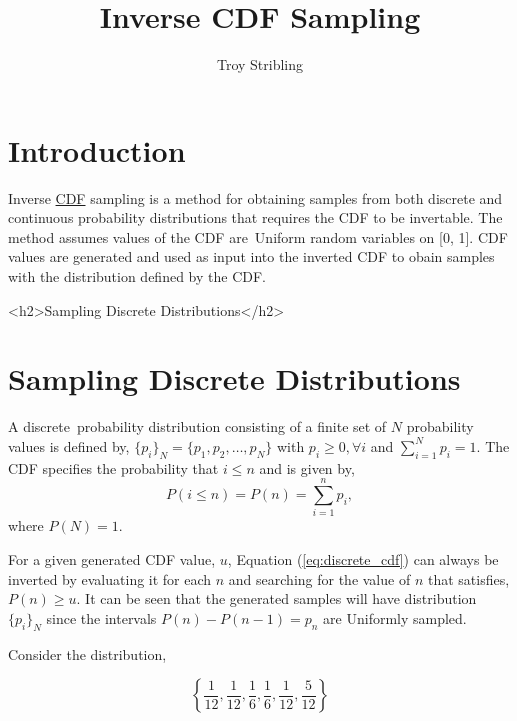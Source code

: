 \documentclass[12pt]{article}
\title{Inverse CDF Sampling}
\author{Troy Stribling}
\begin{document}
\iftex
\maketitle
\section{Introduction}
\fi

Inverse \href{https://en.wikipedia.org/wiki/Cumulative_distribution_function}{CDF} sampling is a method for obtaining samples
from both discrete and continuous probability distributions
that requires the CDF to be invertable. The method assumes values of the CDF are Uniform random variables on [0, 1].
CDF values are generated and used as input into the inverted CDF to obain samples with the distribution defined by the CDF.

\ifblog
<h2>Sampling Discrete Distributions</h2>
\fi
\iftex
\section{Sampling Discrete Distributions}
\fi

A discrete probability distribution consisting of a finite set of $N$ probability values is defined by,
$\{p_i\}_N = \{p_1, p_2,\ldots,p_N\}$ with $p_i \geq 0, \forall i$ and $\sum_{i=1}^N{p_i} = 1.$ The CDF specifies the probability
that $i \leq n$ and is given by,
\begin{equation}
\label{eq:discrete_cdf}
P(i \leq n)=P(n)=\sum_{i=1}^n{p_i},
\end{equation}
where $P(N)=1.$

For a given generated CDF value, $u$, Equation (\ref{eq:discrete_cdf}) can always be inverted by evaluating it for each $n$ and
searching for the value of $n$ that satisfies, $P(n) \geq u.$ It can be seen that the generated samples will have
distribution $\{p_i\}_N$ since the intervals $P(n)-P(n-1) = p_n$ are Uniformly sampled.

Consider the distribution,

\begin{equation} 
\left\{\frac{1}{12}, \frac{1}{12}, \frac{1}{6}, \frac{1}{6}, \frac{1}{12}, \frac{5}{12} \right\}
\label{eq:discrete}
\end{equation}
\end{document}
